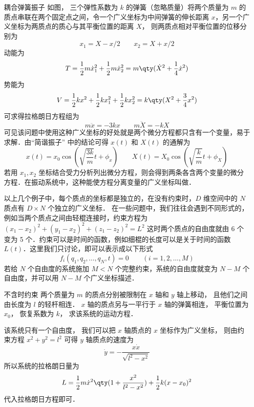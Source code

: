 \begin{exam}{耦合弹簧振子}
如图，%
三个弹性系数为 $k$ 的弹簧（忽略质量）将两个质量为 $m$ 的质点串联在两个固定点之间，令一个广义坐标为中间弹簧的伸长距离 $x$，另一个广义坐标为两质点的质心与其平衡位置的距离 $X$， 则两质点相对平衡位置的位移分别为
\begin{equation}
x_1=X-x/2 \qquad x_2 = X+x/2
\end{equation}
动能为
\begin{equation}
T=\frac12 m\dot x_1^2 + \frac12 m\dot x_2^2 = m \qty(\dot X^2 + \frac14 \dot x^2)
\end{equation}
势能为
\begin{equation}
V = \frac12 k x^2 + \frac12 kx_1^2 + \frac12 k x_2^2 = k\qty(X^2 + \frac34 x^2)
\end{equation}
可求得拉格朗日方程组为
\begin{equation}
m\ddot x =  - 3kx \qquad m\ddot X =  - kX
\end{equation}
可见该问题中使用这种广义坐标的好处就是两个微分方程都只含有一个变量，易于求解．由“简谐振子” 中的结论可得 $x(t)$ 和 $X(t)$ 的通解为
\begin{equation}
x(t) = x_0 \cos(\sqrt{\frac{3k}{m}} t + \phi_x)
\qquad
X(t) = X_0 \cos(\sqrt{\frac{k}{m}} t + \phi_X)
\end{equation}
若用 $x_1, x_2$ 坐标结合受力分析列出微分方程，则会得到两条各含两个变量的微分方程．在振动系统中，这种能使方程分离变量的广义坐标叫做．%
\end{exam}

以上几个例子中，每个质点的坐标都是独立的，在没有约束时，$D$ 维空间中的 $N$ 质点有 $D\times N$ 个独立的广义坐标． 在一些问题中，我们往往会遇到不同形式的，例如当两个质点之间由轻棍连接时，约束方程为 $(x_1-x_2)^2+(y_1-x_2)^2+(z_1-z_2)^2=L^2$ 这时两个质点的自由度就由 6 个变为 5 个．约束可以是时间的函数，例如细棍的长度可以是关于时间的函数 $L(t)$．这里我们只讨论，即可以表示成以下形式
\begin{equation}
f_i(q_1,q_2,\dots ,q_N,t) = 0 \qquad (i = 1,2,\dots,M)
\end{equation}
若给 $N$ 个自由度的系统施加 $M<N$ 个完整约束，系统的自由度就变为 $N-M$ 个自由度，并可以用 $N-M$ 个广义坐标描述．

\begin{exam}{不含时约束}
两个质量为 $m$ 的质点分别被限制在 $x$ 轴和 $y$ 轴上移动， 且他们之间由长度为 $l$ 的轻杆相连． $x$ 轴的质点另与一平行于 $x$ 轴的弹簧相连， 平衡位置为 $x_0$， 恢复系数为 $k$， 求该系统的运动方程．%

该系统只有一个自由度， 我们可以把 $x$ 轴质点的 $x$ 坐标作为广义坐标， 则由约束方程 $x^2 + y^2 = l^2$ 可得 $y$ 轴质点的速度为
\begin{equation}
\dot y = -\frac{x\dot x}{\sqrt{l^2 - x^2}}
\end{equation}
所以系统的拉格朗日量为
\begin{equation}
L = \frac12 m \dot x^2\qty(1 + \frac{x^2}{l^2 - x^2}) + \frac12 k (x-x_0)^2
\end{equation}
代入拉格朗日方程即可．
\end{exam}


